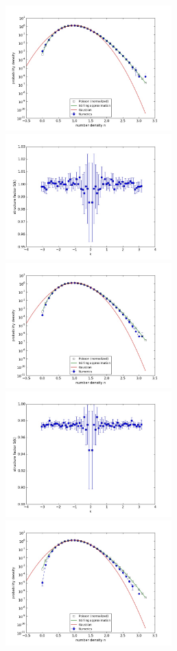 \documentclass{article}
\begin{document}
\begin{figure}
\begin{center}
\end{center}
\includegraphics[width=0.5\linewidth,height=1.9in]{fig1/appendix_dt0.01_diff_hist_avg1.jpg}
\includegraphics[width=0.5\linewidth,height=1.9in]{fig1/appendix_dt0.01_diff_Sk_avg1.jpg}
\includegraphics[width=0.5\linewidth,height=1.9in]{fig1/appendix_dt0.01_diff_hist_avg2.jpg}
\includegraphics[width=0.5\linewidth,height=1.9in]{fig1/appendix_dt0.01_diff_Sk_avg2.jpg}
\includegraphics[width=0.5\linewidth,height=1.9in]{fig1/appendix_dt0.01_diff_hist_avg3.jpg}

\end{figure}
\end{document}
